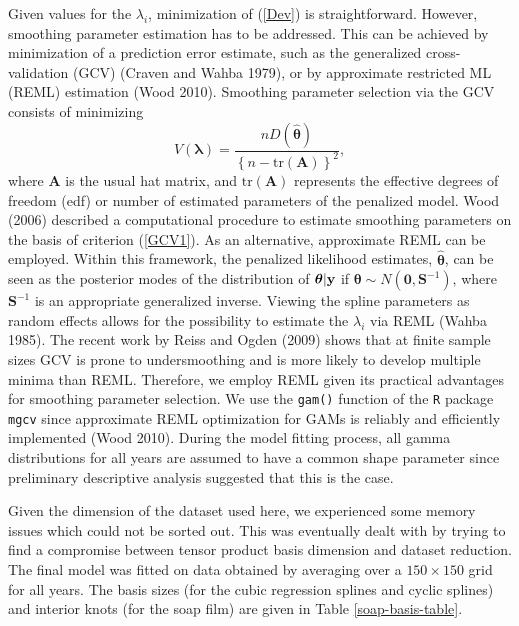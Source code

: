 \documentclass[10pt] {article}
\newcommand{\beq}{\begin{equation}}
\newcommand{\eeq}{\end{equation}}
\theoremstyle{definition}
\theoremstyle{plain}
\begin{document}
Given values for the $\lambda_i$, minimization of (\ref{Dev}) is straightforward. However, smoothing parameter estimation has to be addressed. This can be achieved by minimization of a prediction error estimate, such as the generalized cross-validation (GCV) (Craven and Wahba 1979), or by approximate restricted ML (REML) estimation (Wood 2010). Smoothing parameter selection via the GCV consists of minimizing 
\beq
V(\bm\lambda)=\frac{nD(\hat{\bm\theta})}{\left\{n-\text{tr}(\textbf{A})\right\}^2},
\label{GCV1}
\eeq
where $\textbf{A}$ is the usual hat matrix, and $\text{tr}(\textbf{A})$ represents the effective degrees of freedom (edf) or number of estimated parameters of the penalized model. Wood (2006) described a computational procedure to estimate smoothing parameters on the basis of criterion (\ref{GCV1}). As an alternative, approximate REML can be employed. Within this framework, the penalized likelihood estimates, $\hat{\bm\theta}$, can be seen as the posterior modes of the distribution of $\bm\theta|{\bf y}$ if $\bm\theta \sim N(\textbf{0},\textbf{S}^{-1})$, where $\textbf{S}^{-1}$ is an appropriate generalized inverse. Viewing the spline parameters as random effects allows for the possibility to estimate the $\lambda_i$ via REML (Wahba 1985). The recent work by Reiss and Ogden (2009) shows that at finite sample sizes GCV is prone to undersmoothing and is more likely to develop multiple minima than REML. Therefore, we employ REML given its practical advantages for smoothing parameter selection. We use the \texttt{gam()} function of the \texttt{R} package \texttt{mgcv} since approximate REML optimization for GAMs is reliably and efficiently implemented (Wood 2010). During the model fitting process, all gamma distributions for all years are assumed to have a common shape parameter since preliminary descriptive analysis suggested that this is the case.

Given the dimension of the dataset used here, we experienced some memory issues which could not be sorted out. This was eventually dealt with by trying to find a compromise between tensor product basis dimension and dataset reduction. The final model was fitted on data obtained by averaging over a $150\times150$ grid for all years. The basis sizes (for the cubic regression splines and cyclic splines) and interior knots (for the soap film) are given in Table \ref{soap-basis-table}.
\end{document}
